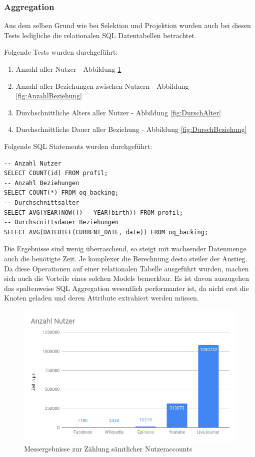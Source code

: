 \subsubsection{Aggregation}
Aus dem selben Grund wie bei Selektion und Projektion wurden auch bei diesen Tests ledigliche die relationalen SQL Datentabellen betrachtet.

Folgende Tests wurden durchgeführt:
\begin{enumerate}
	\item Anzahl aller Nutzer - Abbildung \ref{fig:AnzahlNutzer}
	\item Anzahl aller Beziehungen zwischen Nutzern - Abbildung \ref{fig:AnzahlBeziehung}
	\item Durchschnittliche Alters aller Nutzer - Abbildung \ref{fig:DurschAlter}
	\item Durchschnittliche Dauer aller Beziehung - Abbildung \ref{fig:DurschBeziehung}
\end{enumerate}

Folgende SQL Statements wurden durchgeführt:
\begin{lstlisting}
-- Anzahl Nutzer
SELECT COUNT(id) FROM profil;
-- Anzahl Beziehungen
SELECT COUNT(*) FROM oq_backing;
-- Durchschnittsalter
SELECT AVG(YEAR(NOW()) - YEAR(birth)) FROM profil;
-- Durchscnittsdauer Beziehungen
SELECT AVG(DATEDIFF(CURRENT_DATE, date)) FROM oq_backing;
\end{lstlisting}

Die Ergebnisse sind wenig überraschend, so steigt mit wachsender Datenmenge auch die benötigte Zeit. Je komplexer die Berechnung desto steiler der Anstieg. Da diese Operationen auf einer relationalen Tabelle ausgeführt wurden, machen sich auch die Vorteile eines solchen Models bemerkbar. Es ist davon auszugehen das spaltenweise SQL Aggregation wesentlich performanter ist, da nicht erst die Knoten geladen und deren Attribute extrahiert werden müssen.

\begin{figure}[h!]
	\centering
	\includegraphics[width=\textwidth]{images/AnzahlNutzer.png}
	\caption{Messergebnisse zur Zählung sämtlicher Nutzeraccounts}
	\label{fig:AnzahlNutzer}
\end{figure}

